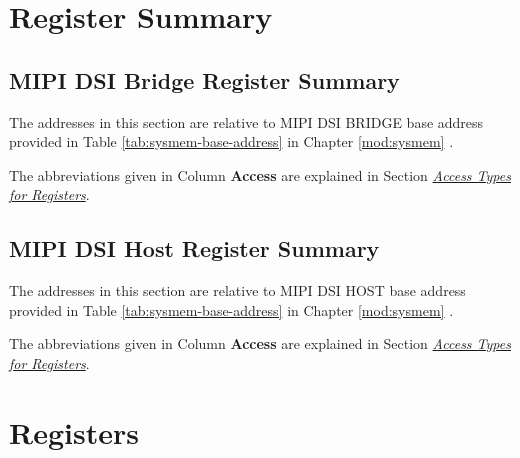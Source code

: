 \documentclass[main\_\_EN.tex]{subfiles}
\begin{document}



\newpage
\hypertarget{mipidsi-reg-summ}{}
\section{Register Summary}
\label{sec:mipidsi-reg-summ}


\subsection{MIPI DSI Bridge Register Summary}

The addresses in this section are relative to MIPI DSI BRIDGE base address provided in Table \ref{tab:sysmem-base-address} in Chapter \ref{mod:sysmem} \textit{}.

The abbreviations given in Column \textbf{Access} are explained in Section \hyperref[glossary-access-types]{\textit{Access Types for Registers}}.



\subsection{MIPI DSI Host Register Summary}

The addresses in this section are relative to MIPI DSI HOST base address provided in Table \ref{tab:sysmem-base-address} in Chapter \ref{mod:sysmem} \textit{}.

The abbreviations given in Column \textbf{Access} are explained in Section \hyperref[glossary-access-types]{\textit{Access Types for Registers}}.







\newpage
\section{Registers}
\end{document}
